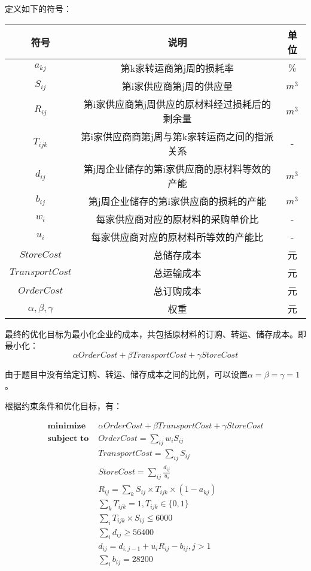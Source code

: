 \documentclass{my_paper}
\begin{document}
定义如下的符号：
\begin{table}[h]
		\centering
		\begin{tabular}{ccc}
			\hline
			符号 &  说明  & 单位 \\
			\hline
      $a_{kj}$ & 第k家转运商第j周的损耗率  & \% \\
      $S_{ij}$ & 第i家供应商第j周的供应量 & $m^3$ \\
      $R_{ij}$ & 第i家供应商第j周供应的原材料经过损耗后的剩余量 & $m^3$ \\
      $T_{ijk}$ & 第i家供应商商第j周与第k家转运商之间的指派关系 & - \\
      $d_{ij} $ & 第j周企业储存的第i家供应商的原材料等效的产能 & $m^3$ \\ 
      $b_{ij} $ & 第j周企业储存的第i家供应商的损耗的产能 & $m^3$ \\ 
      $ w_{i}$ & 每家供应商对应的原材料的采购单价比& - \\
      $ u_{i}$ & 每家供应商对应的原材料所等效的产能比 & - \\
     	$ StoreCost$ & 总储存成本 & 元 \\
      $TransportCost$ & 总运输成本 & 元 \\
      $ OrderCost$ & 总订购成本  & 元  \\
      $\alpha, \beta, \gamma$  & 权重 & 元 \\
 		\end{tabular}
	\end{table} 

最终的优化目标为最小化企业的成本，共包括原材料的订购、转运、储存成本。即最小化：
$$ \alpha OrderCost + \beta TransportCost + \gamma StoreCost $$

由于题目中没有给定订购、转运、储存成本之间的比例，可以设置$\alpha=\beta=\gamma=1$。

根据约束条件和优化目标，有：

\begin{align*}
\textbf{minimize  } &\alpha OrderCost + \beta TransportCost + \gamma StoreCost \\
\textbf{subject to }  & OrderCost =  \sum_{ij} w_{i} S_{ij} \\
& TransportCost = \sum_{ij} S_{ij} \\
& StoreCost = \sum_{ij} \frac{d_{ij}}{u_i}  \\
& R_{ij} =  \sum_{k} S_{ij} \times  T_{ijk} \times (1-a_{kj}) \\
&  \sum_{k} T_{ijk} = 1 , T_{ijk} \in \{0,1\} \\
& \sum_{i} T_{ijk} \times S_{ij} \le 6000 \\
& \sum_i d_{ij} \ge 56400 \\
& d_{ij} = d_{i,j-1} + u_{i} R_{ij} - b_{ij} ,j > 1 \\
& \sum_{i} b_{ij} = 28200 \\ 
\end{align*}
\end{document}

